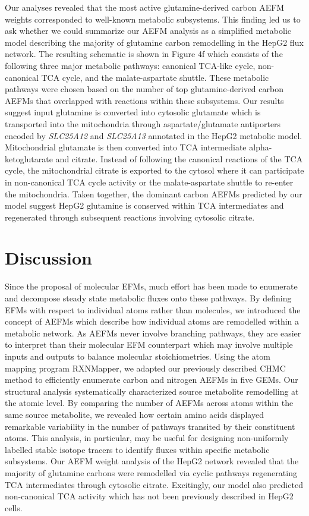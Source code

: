\documentclass[12pt]{article}
\begin{document}
Our analyses revealed that the most active glutamine-derived carbon AEFM
weights corresponded to well-known metabolic subsystems. This finding led
us to ask whether we could summarize our AEFM analysis as a simplified
metabolic model describing the majority of glutamine carbon remodelling in
the HepG2 flux network. The resulting schematic is shown in Figure 4f
which consists of the following three major metabolic pathways: canonical
TCA-like cycle, non-canonical TCA cycle, and the malate-aspartate shuttle.
These metabolic pathways were chosen based on the number of top
glutamine-derived carbon AEFMs that overlapped with reactions within these
subsystems. Our results suggest input glutamine is converted into
cytosolic glutamate which is transported into the mitochondria through
aspartate/glutamate antiporters encoded by \textit{SLC25A12} and
\textit{SLC25A13} annotated in the HepG2 metabolic model. Mitochondrial
glutamate is then converted into TCA intermediate alpha-ketoglutarate and
citrate. Instead of following the canonical reactions of the TCA cycle,
the mitochondrial citrate is exported to the cytosol where it can
participate in non-canonical TCA cycle activity or the malate-aspartate
shuttle to re-enter the mitochondria. Taken together, the dominant carbon
AEFMs predicted by our model suggest HepG2 glutamine is conserved within
TCA intermediates and regenerated through subsequent reactions involving
cytosolic citrate.

\section*{Discussion}

Since the proposal of molecular EFMs, much effort has been made to
enumerate and decompose steady state metabolic fluxes onto these pathways.
By defining EFMs with respect to individual atoms rather than molecules,
we introduced the concept of AEFMs which describe how individual atoms are
remodelled within a metabolic network. As AEFMs never involve branching
pathways, they are easier to interpret than their molecular EFM
counterpart which may involve multiple inputs and outputs to balance
molecular stoichiometries. Using the atom mapping program RXNMapper, we
adapted our previously described CHMC method to efficiently enumerate
carbon and nitrogen AEFMs in five GEMs. Our structural analysis
systematically characterized source metabolite remodelling at the atomic
level. By comparing the number of AEFMs across atoms within the same
source metabolite, we revealed how certain amino acids displayed
remarkable variability in the number of pathways transited by their
constituent atoms. This analysis, in particular, may be useful for
designing non-uniformly labelled stable isotope tracers to identify fluxes
within specific metabolic subsystems. Our AEFM weight analysis of
the HepG2 network revealed that the majority of glutamine carbons were
remodelled via cyclic pathways regenerating TCA intermediates through
cytosolic citrate. Excitingly, our model also predicted non-canonical TCA
activity which has not been previously described in HepG2 cells.
\end{document}

